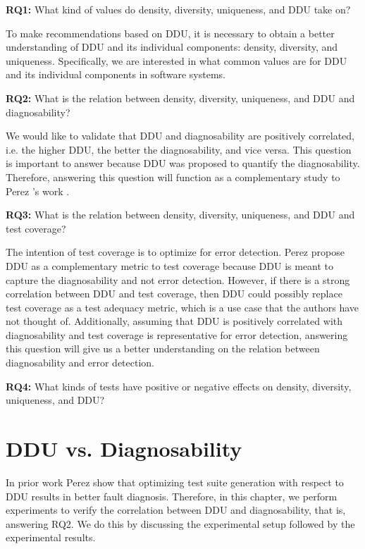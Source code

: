 \documentclass[twoside,a4paper,11pt]{memoir}
\begin{document}
\begin{framed}
\noindent
\textbf{RQ1:} What kind of values do density, diversity, uniqueness, and DDU take on?
\end{framed}

To make recommendations based on DDU, it is necessary to obtain a better understanding of DDU and its individual components: density, diversity, and uniqueness.
Specifically, we are interested in what common values are for DDU and its individual components in software systems.

\begin{framed}
\noindent
\textbf{RQ2:} What is the relation between density, diversity, uniqueness, and DDU and diagnosability?
\end{framed}

We would like to validate that DDU and diagnosability are positively correlated, i.e. the higher DDU, the better the diagnosability, and vice versa.
This question is important to answer because DDU was proposed to quantify the diagnosability.
Therefore, answering this question will function as a complementary study to Perez \etal's work \cite{DBLP:conf/icse/PerezAD17}.

\begin{framed}
\noindent
\textbf{RQ3:} What is the relation between density, diversity, uniqueness, and DDU and test coverage?
\end{framed}

The intention of test coverage is to optimize for error detection.
Perez \etal propose DDU as a complementary metric to test coverage \cite{DBLP:conf/icse/PerezAD17} because DDU is meant to capture the diagnosability and not error detection.
However, if there is a strong correlation between DDU and test coverage, then DDU could possibly replace test coverage as a test adequacy metric, which is a use case that the authors have not thought of.
Additionally, assuming that DDU is positively correlated with diagnosability and test coverage is representative for error detection, answering this question will give us a better understanding on the relation between diagnosability and error detection.

\begin{framed}
\noindent
\textbf{RQ4:} What kinds of tests have positive or negative effects on density, diversity, uniqueness, and DDU?
\end{framed}
\chapter{DDU vs. Diagnosability}
\label{ch:rq2}
In prior work Perez \etal \cite{DBLP:conf/icse/PerezAD17} show that optimizing test suite generation with respect to DDU results in better fault diagnosis.
Therefore, in this chapter, we perform experiments to verify the correlation between DDU and diagnosability, that is, answering RQ2.
We do this by discussing the experimental setup followed by the experimental results.
\end{document}
